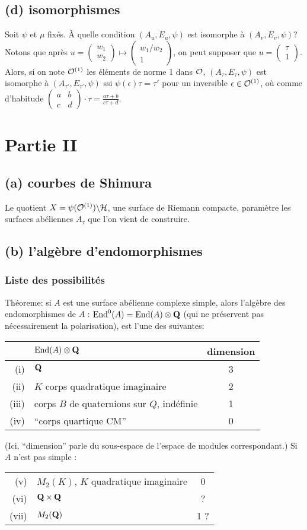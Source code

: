 \documentclass[a4paper, 12pt]{article}
\newcommand{\End}{\mathrm{End}} \DeclareMathOperator*{\trd}{trd} \DeclareMathOperator*{\nrd}{nrd}
\newcommand{\cvtwo}[2]{{\left(\begin{array}{c}{#1}\\ {#2}\end{array}\right)}}
\newcommand{\mtwo}[4]{{\left(\begin{array}{cc}{#1} & {#2} \\ {#3} & {#4}\end{array}\right)}}
\begin{document}
\begin{itemize}
\subsection*{(d) isomorphismes}
Soit \(\psi\) et \(\mu\) fix\'es.
\`A quelle condition
\((A_u,E_u,\psi)\) est isomorphe \`a \((A_v,E_v,\psi)\)?
Notons que apr\`es \(u = \cvtwo{w_1}{w_2} \mapsto \cvtwo{w_1/w_2}{1}\),
on peut supposer que
\(u = \cvtwo{\tau}{1}\).
Alors, si on note $\mathcal{O}^{(1)}$ les \'el\'ements de norme 1 dans $\mathcal{O}$, 
\((A_\tau,E_\tau,\psi)\) est isomorphe \`a \((A_{\tau'},E_{\tau'},\psi)\)
ssi
\(\psi(\epsilon)\tau = \tau'\)
pour un inversible \(\epsilon\in\mathcal{O}^{(1)}\),
o\`u comme d'habitude
\(\mtwo{a}{b}{c}{d}\cdot\tau = \frac{a\tau + b}{c\tau + d}\).
\section{%
Partie II
}%
\subsection*{(a) courbes de Shimura}
Le quotient \(X = \psi(\mathcal{O}^{(1)})\backslash\mathcal{H}\), une surface de
Riemann compacte,
param\`etre les surfaces ab\'eliennes \(A_\tau\) que l'on vient de
construire.
\subsection*{(b) l'alg\`ebre d'endomorphismes}
\subsubsection*{Liste des possibilit\'es}
Th\'eoreme: si \(A\) est une surface ab\'elienne complexe simple,
alors l'alg\`ebre des endomorphismes de $A$ : \(\End^0(A)=\End(A)\otimes\Q\) (qui ne pr\'eservent pas n\'ecessairement la polarisation), est l'une des suivantes:
\begin{center}
\begin{tabular}{rl|c}
& \(\End(A)\otimes\Q\) & dimension \\
\hline
(i) & \(\mathbf{Q}\) & 3 \\
(ii) & \(K\) corps quadratique imaginaire & 2 \\
(iii) & corps \(B\) de quaternions sur $Q$, indéfinie & 1 \\
(iv) & ``corps quartique CM'' & 0 \\
\end{tabular}
\end{center}
(Ici, ``dimension'' parle du sous-espace de l'espace de modules
correspondant.)
Si $A$ n'est pas simple :
\begin{center}
\begin{tabular}{rl|c}
(v) & \(M_2(K)\), \(K\) quadratique imaginaire & 0 \\
(vi) & $\mathbf{Q}\times\mathbf{Q}$ & ? \\
(vii) & $M_2(\mathbf{Q})$ & 1 ? \\
\end{tabular}
\end{center}

\end{itemize}
\end{document}

